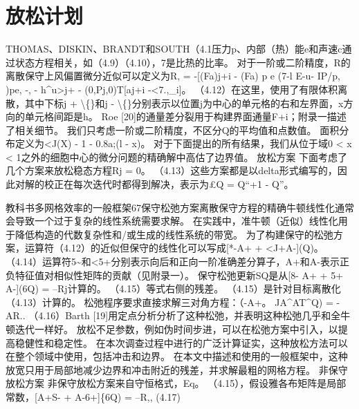 \documentclass[UTF8,11pt,a4paper,openany,fontset=fandol]{ctexbook}
\begin{document}
\section{放松计划}
THOMAS、DISKIN、BRANDT和SOUTH（4.1压力p、内部（热）能e和声速c通过状态方程相关，如（4.9）（4.10），7是比热的比率。 对于一阶或二阶精度，R的离散保守上风偏置微分近似可以定义为R, = -[(Fa)j+i - (Fa) p e (7-l E-u- IP/p, )pe, -, - h\textasciicircum{}u>j+ - (0,Pj,0)T[aj+i -<7.,\_i]。 （4.12）在这里，使用了有限体积离散，其中下标j + \textbackslash\{\}和j - \textbackslash\{\}分别表示以位置j为中心的单元格的右和左界面，x方向的单元格间距是h。 Roe [20]的通量差分裂用于构建界面通量F+i；附录一描述了相关细节。 我们只考虑一阶或二阶精度，不区分Q的平均值和点数值。 面积分布定义为<J(X) - 1 - 0.8a;(l - x)。 对于下面提出的所有结果，我们从位于域0 < x < 1之外的细胞中心的微分问题的精确解中高估了边界值。 放松方案 下面考虑了几个方案来放松稳态方程Rj = 0。 （4.13）这些方案都是以delta形式编写的，因此对解的校正在每次迭代时都得到解决，表示为£Q = Q“+1 - Q”。

教科书多网格效率的一般框架67保守松弛方案离散保守方程的精确牛顿线性化通常会导致一个过于复杂的线性系统需要求解。 在实践中，准牛顿（近似）线性化用于降低构造的代数复杂性和/或生成的线性系统的带宽。 为了构建保守的松弛方案，运算符（4.12）的近似但保守的线性化可以写成[*-A+ + <J+A-](Q)。 （4.14）运算符5\textasciitilde{}和<5+分别表示向后和正向一阶准确差分算子，A+和A-表示正负特征值对相似性矩阵的贡献（见附录一）。 保守松弛更新SQ是从[8- A+ + 5+ A-](6Q) = --Rj计算的。 （4.15）等式右侧的残差。 （4.15）是针对目标离散化（4.13）计算的。 松弛程序要求直接求解三对角方程：（-A+。 JA\textasciicircum{}AT\textasciicircum{}Q) = -AR.. （4.16）Barth [19]用定点分析分析了这种松弛，并表明这种松弛几乎和全牛顿迭代一样好。 放松不足参数，例如伪时间步进，可以在松弛方案中引入，以提高稳健性和稳定性。 在本次调查过程中进行的广泛计算证实，这种放松方法可以在整个领域中使用，包括冲击和边界。 在本文中描述和使用的一般框架中，这种放宽只用于局部地减少边界和冲击附近的残差，并求解最粗的网格方程。 非保守放松方案 非保守放松方案来自守恒格式，Eq。 （4.15），假设雅各布矩阵是局部常数，[A+S- + A-6+]\{6Q) = --R,, (4.17)
\end{document}
